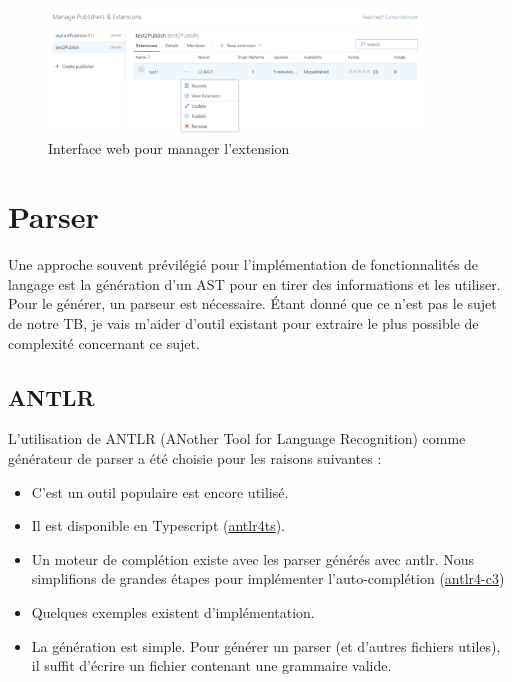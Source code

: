 \documentclass[
    iict, %
    il, %
]{heig-tb}
\begin{document}
\begin{figure}[!ht]
    \begin{center}
        \includegraphics[width=10cm]{assets/figures/manage-publisher.png}
    \end{center}
    \caption[Interface web pour manager l'extension]{\label{manage-publisher} Interface web pour manager l'extension}
\end{figure}


\section{Parser}
Une approche souvent prévilégié pour l'implémentation de fonctionnalités de langage est la génération d'un AST pour en tirer des informations et les utiliser. Pour le générer, un parseur est nécessaire. Étant donné que ce n'est pas le sujet de notre TB, je vais m'aider d'outil existant pour extraire le plus possible de complexité concernant ce sujet.

\subsection{ANTLR}
L'utilisation de ANTLR (ANother Tool for Language Recognition) comme générateur de parser a été choisie pour les raisons suivantes :
\begin{itemize}
    \item C'est un outil populaire est encore utilisé.
    \item Il est disponible en Typescript (\href{https://github.com/tunnelvisionlabs/antlr4ts}{antlr4ts}).
    \item Un moteur de complétion existe avec les parser générés avec antlr. Nous simplifions de grandes étapes pour implémenter l'auto-complétion (\href{https://github.com/mike-lischke/antlr4-c3}{antlr4-c3})
    \item Quelques exemples existent d'implémentation.
    \item La génération est simple. Pour générer un parser (et d'autres fichiers utiles), il suffit d'écrire un fichier contenant une grammaire valide.
\end{itemize}
\end{document}
